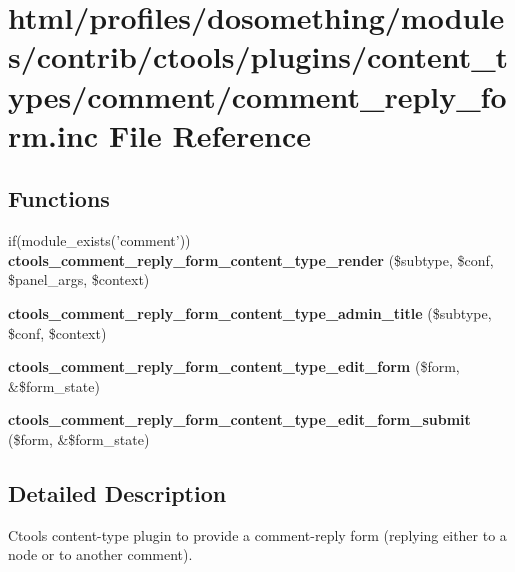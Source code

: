 \hypertarget{comment__reply__form_8inc}{
\section{html/profiles/dosomething/modules/contrib/ctools/plugins/content\_\-types/comment/comment\_\-reply\_\-form.inc File Reference}
\label{comment__reply__form_8inc}
}
\subsection*{Functions}
\begin{DoxyCompactItemize}
\item 
\hypertarget{comment__reply__form_8inc_aaeb80bed8f4a2ce9ea708a25474f9037}{
if(module\_\-exists('comment')) {\bfseries ctools\_\-comment\_\-reply\_\-form\_\-content\_\-type\_\-render} (\$subtype, \$conf, \$panel\_\-args, \$context)}
\label{comment__reply__form_8inc_aaeb80bed8f4a2ce9ea708a25474f9037}

\item 
\hypertarget{comment__reply__form_8inc_a56d839330a413ca94eb3d51af2c610c7}{
{\bfseries ctools\_\-comment\_\-reply\_\-form\_\-content\_\-type\_\-admin\_\-title} (\$subtype, \$conf, \$context)}
\label{comment__reply__form_8inc_a56d839330a413ca94eb3d51af2c610c7}

\item 
\hypertarget{comment__reply__form_8inc_af61bb6383423b067368472a2b1d4bdd4}{
{\bfseries ctools\_\-comment\_\-reply\_\-form\_\-content\_\-type\_\-edit\_\-form} (\$form, \&\$form\_\-state)}
\label{comment__reply__form_8inc_af61bb6383423b067368472a2b1d4bdd4}

\item 
\hypertarget{comment__reply__form_8inc_a0663202a5e1f369ed36fb3608f9a0005}{
{\bfseries ctools\_\-comment\_\-reply\_\-form\_\-content\_\-type\_\-edit\_\-form\_\-submit} (\$form, \&\$form\_\-state)}
\label{comment__reply__form_8inc_a0663202a5e1f369ed36fb3608f9a0005}

\end{DoxyCompactItemize}


\subsection{Detailed Description}
Ctools content-\/type plugin to provide a comment-\/reply form (replying either to a node or to another comment). 